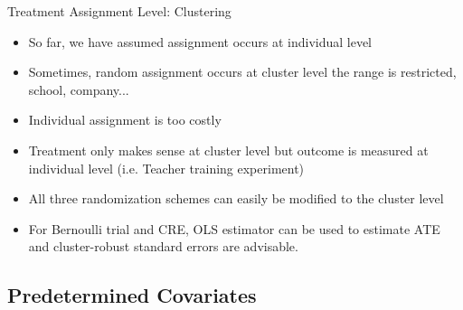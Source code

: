 \documentclass[11pt,aspectratio=169]{beamer}
\begin{document}
\begin{frame}


\end{frame}



\begin{frame}{Treatment Assignment Level: Clustering}
\begin{itemize}
  \item So far, we have assumed assignment occurs at individual level
  \item Sometimes, random assignment occurs at cluster level {the range is restricted, school, company...}
  \item Individual assignment is too costly
  \item Treatment only makes sense at cluster level but outcome is measured at individual level (i.e. Teacher training experiment)
  \item All three randomization schemes can easily be modified to the cluster level
  \item For Bernoulli trial and CRE, OLS estimator can be used to estimate ATE and cluster-robust standard errors are advisable.

\end{itemize}
\end{frame}

\subsection{Predetermined Covariates}
\end{document}
